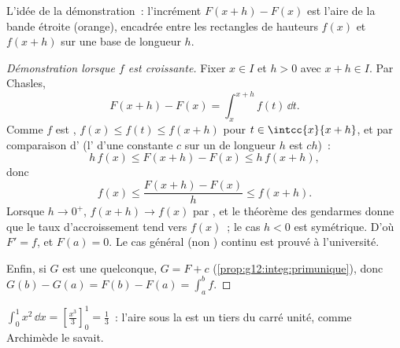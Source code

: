 \begin{omfigure}

{\small L'idée de la démonstration~: l'incrément $F(x+h) - F(x)$ est
l'aire de la bande étroite (orange), encadrée entre les rectangles de
hauteurs $f(x)$ et $f(x+h)$ sur une base de longueur $h$.}
\end{omfigure}

\begin{proof}[Démonstration lorsque $f$ est croissante]
Fixer $x \in I$ et $h > 0$ avec $x + h \in I$. Par Chasles,
\[
F(x+h) - F(x) = \int_x^{x+h} f(t)\,\dd t .
\]
Comme $f$ est , $f(x) \leq f(t) \leq f(x+h)$ pour
$t \in \intcc{x}{x+h}$, et par comparaison d' (l'
d'une constante $c$ sur un  de longueur $h$ est $ch$)~:
\[
h\,f(x) \leq F(x+h) - F(x) \leq h\,f(x+h),
\]
donc
\[
f(x) \leq \frac{F(x+h) - F(x)}{h} \leq f(x+h).
\]
Lorsque $h \to 0^+$, $f(x+h) \to f(x)$ par , et le théorème des
gendarmes donne que le taux d'accroissement tend vers $f(x)$~; le cas
$h < 0$ est symétrique. D'où $F' = f$, et $F(a) = 0$. Le cas général
(non ) continu est prouvé à l'université.

Enfin, si $G$ est une  quelconque, $G = F + c$
(\cref{prop:g12:integ:primunique}), donc
$G(b) - G(a) = F(b) - F(a) = \int_a^b f$.
\end{proof}

\begin{example}
$\displaystyle\int_0^1 x^2\,\dd x = \left[\frac{x^3}{3}\right]_0^1 =
\frac13$~: l'aire sous la  est un tiers du carré unité, comme
Archimède le savait.
\end{example}

